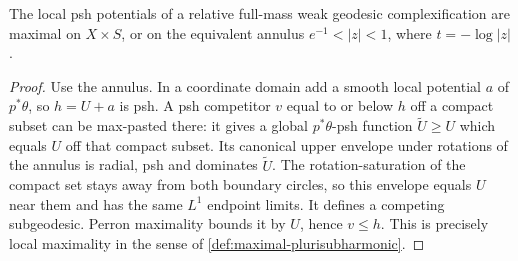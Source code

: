 \begin{lemma}\label{lem:perron-complexification-maximal}
The local psh potentials of a relative full-mass weak geodesic complexification are maximal on $X\times S$, or on the equivalent annulus $e^{-1}<|z|<1$, where $t=-\log|z|$.
\end{lemma}
\begin{proof}
Use the annulus. In a coordinate domain add a smooth local potential $a$ of $p^*\theta$, so $h=U+a$ is psh. A psh competitor $v$ equal to or below $h$ off a compact subset can be max-pasted there: it gives a global $p^*\theta$-psh function $\widetilde U\geq U$ which equals $U$ off that compact subset. Its canonical upper envelope under rotations of the annulus is radial, psh and dominates $\widetilde U$. The rotation-saturation of the compact set stays away from both boundary circles, so this envelope equals $U$ near them and has the same $L^1$ endpoint limits. It defines a competing subgeodesic. Perron maximality bounds it by $U$, hence $v\leq h$. This is precisely local maximality in the sense of \cref{def:maximal-plurisubharmonic}.
\end{proof}

